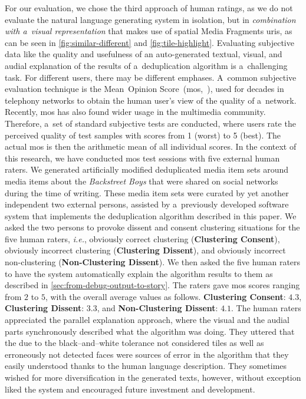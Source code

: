 \documentclass{article}
\begin{document}
For our evaluation, we chose the third approach of human ratings,
as we do not evaluate the natural language generating system in isolation,
but in \emph{combination with a~visual representation}
that makes use of spatial Media Fragments {\sc uri}s,
as can be seen in \autoref{fig:similar-different}
and \autoref{fig:tile-highlight}.
Evaluating subjective data like the quality and usefulness
of an auto-generated textual, visual, and audial explanation
of the results of a~deduplication algorithm
is a~challenging task.
For different users, there may be different emphases.
A~common subjective evaluation technique
is the Mean~Opinion Score~({\sc mos},~\cite{itu1998mos}),
used for decades in telephony networks to
obtain the human user's view of the quality of a~network.
Recently, {\sc mos} has also found wider usage in the multimedia community.
Therefore, a~set of standard subjective tests are conducted,
where users rate the perceived quality of test samples
with scores from 1 (worst) to 5 (best).
The actual {\sc mos} is then the arithmetic mean of all individual scores.
In the context of this research, we have conducted {\sc mos} test sessions
with five external human raters.
We generated artificially modified deduplicated media item sets
around media items about the \emph{Backstreet Boys}
that were shared on social networks during the time of writing.
These media item sets were curated by yet another independent two
external persons, assisted by a~previously developed
software system that implements the deduplication algorithm
described in this paper.
We asked the two persons to provoke dissent and
consent clustering situations for the five human raters,
\emph{i.e.}, obviously correct clustering (\textbf{Clustering Consent}),
obviously incorrect clustering (\textbf{Clustering Dissent}),
and obviously incorrect non-clustering (\textbf{Non-Clustering Dissent}).
We then asked the five human raters to have the system
automatically explain the algorithm results to them
as described in \autoref{sec:from-debug-output-to-story}.
The raters gave {\sc mos} scores ranging from $2$ to $5$,
with the overall average values as follows.
\textbf{Clustering Consent}: $4.3$, \textbf{Clustering Dissent}: $3.3$,
and \textbf{Non-Clustering Dissent}: $4.1$.
The human raters appreciated the parallel explanation approach,
where the visual and the audial parts synchronously described
what the algorithm was doing.
They uttered that the due to the black--and--white tolerance
not considered tiles as well as erroneously not detected faces
were sources of error in the algorithm that they easily understood
thanks to the human language description.
They sometimes wished for more diversification in the generated texts,
however, without exception liked the system
and encouraged future investment and development.
\end{document}
